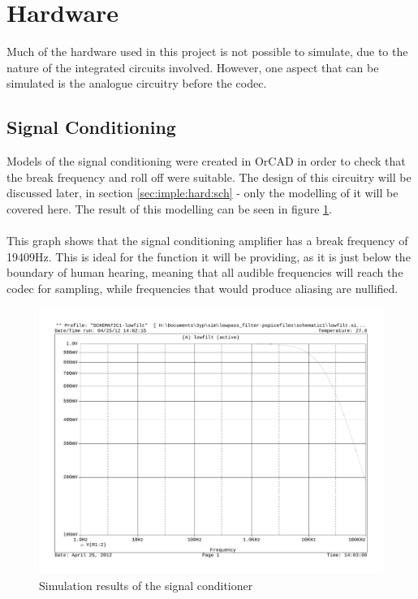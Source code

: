 \section{Hardware}
Much of the hardware used in this project is not possible to simulate, due to
the nature of the integrated circuits involved.
However, one aspect that can be simulated is the analogue circuitry before the
codec.

\subsection{Signal Conditioning}
Models of the signal conditioning were created in OrCAD in order to check that
the break frequency and roll off were suitable.
The design of this circuitry will be discussed later, in section
\ref{sec:imple:hard:sch} - only the modelling of it will be covered here.
The result of this modelling can be seen in figure \ref{fig:sigcondmodel}.
\\
\\
This graph shows that the signal conditioning amplifier has a break frequency
of 19409Hz.
This is ideal for the function it will be providing, as it is just below the
boundary of human hearing, meaning that all audible frequencies will reach 
the codec for sampling, while frequencies that would produce aliasing are
nullified.

\begin{figure}[H]
	\centering
	\includegraphics[width=\textwidth]{./img/signal_conditioning_sim.pdf}
	\caption{Simulation results of the signal conditioner}
	\label{fig:sigcondmodel}
\end{figure}

